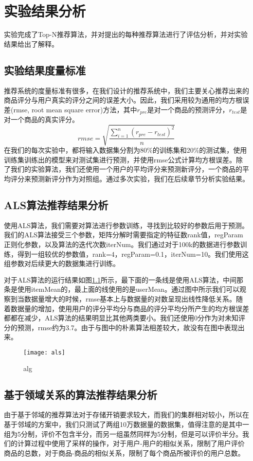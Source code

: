 \chapter{实验结果分析}
实验完成了Top-N推荐算法，并对提出的每种推荐算法进行了评估分析，并对实验结果给出了解释。

\section{实验结果度量标准}
推荐系统的度量标准有很多，在我们设计的推荐系统中，我们主要关心推荐出来的商品评分与用户真实的评分之间的误差大小。因此，我们采用较为通用的均方根误差(rmse, root mean square error)方法，其中$r_{pre}$是对一个商品的预测评分，$r_{test}$是对一个商品的真实评分。
\begin{equation}
rmse = \sqrt{\frac{\sum_{i=1}^{n}(r_{pre} - r_{test})^2}{n}}
\end{equation}
在我们的每次实验中，都将输入数据集分割为80\%的训练集和20\%的测试集，使用训练集训练出的模型来对测试集进行预测，并使用rmse公式计算均方根误差。除了我们的实验算法，我们还使用一个用户的平均评分来预测新评分，一个商品的平均评分来预测新评分作为对照组。通过多次实验，我们在后续章节分析实验结果。
\section{ALS算法推荐结果分析}
使用ALS算法，我们需要对算法进行参数训练，寻找到比较好的参数后用于预测。我们的ALS算法接受三个参数，矩阵分解时需要指定的特征数rank值，regParam正则化参数，以及算法的迭代次数iterNum。我们通过对于100k的数据进行参数训练，得到一组较优的参数值，rank=4，regParam=0.1，iterNum=10。我们使用这组参数对后续更大的数据集进行训练。

对于ALS算法的运行结果如图\ref{fig:als}所示，最下面的一条线是使用ALS算法，中间那条是使用itemMean的，最上面的线使用的是userMean。通过图中所示我们可以观察到当数据量增大的时候，rmse基本上与数据量的对数呈现出线性降低关系。随着数据量的增加，使用用户的评分平均分与商品的评分平均分所产生的均方根误差都都在减少，ALS算法的结果明显比其他两类要小。我们还使用0分作为对未知评分的预测，rmse约为3.7。由于与图中的朴素算法相差较大，故没有在图中表现出来。
\begin{figure}[ht]
\centering
\texttt{[image: als]}
\caption{alg}\label{fig:als}
\end{figure}

\section{基于领域关系的算法推荐结果分析}
由于基于邻域的推荐算法对于存储开销要求较大，而我们的集群相对较小，所以在基于邻域的方案中，我们只测试了两组10万数据量的数据集，值得注意的是其中一组为5分制，评价不包含半分，而另一组虽然同样为5分制，但是可以评价半分。我们的计算过程中使用了采样的操作，对于用户-用户的相似关系，限制了用户评价商品的总数，对于商品-商品的相似关系，限制了每个商品所被评价的用户总数。

